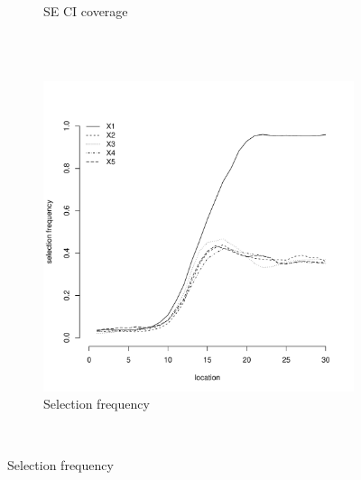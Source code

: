 \documentclass[authoryear, review, 11pt]{elsarticle}
\begin{document}
\begin{figure}
\begin{subfigure}[b]{0.45\textwidth}
		\caption{SE CI coverage}
	\end{subfigure}%
	\\%
	~ %
	\begin{subfigure}[b]{0.45\textwidth}
	\centering
		\includegraphics[width=\textwidth]{../../figures/simulation/15.31.profile_selection.pdf}
		\caption{Selection frequency}
	\end{subfigure}
	~ %

\end{figure}
\end{document}
